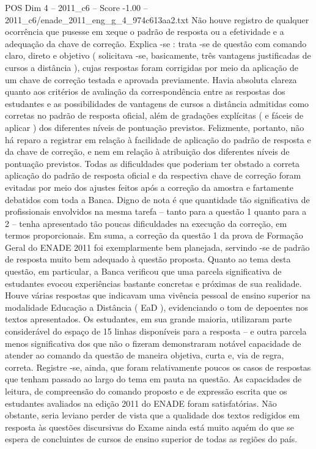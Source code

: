 \begin{textsample}{POS Dim 4 – 2011\_c6 – Score -1.00 – 2011\_c6/enade\_2011\_eng\_g\_4\_974c613aa2.txt}
Não houve registro de qualquer ocorrência que pusesse em xeque o padrão de resposta ou a efetividade e a adequação da chave de correção.
Explica -se : trata -se de questão com comando claro, direto e objetivo ( solicitava -se, basicamente, três vantagens justificadas de cursos a distância ), cujas respostas foram corrigidas por meio da aplicação de um chave de correção testada e aprovada previamente.
Havia absoluta clareza quanto aos critérios de avaliação da correspondência entre as respostas dos estudantes e as possibilidades de vantagens de cursos a distância admitidas como corretas no padrão de resposta oficial, além de gradações explícitas ( e fáceis de aplicar ) dos diferentes níveis de pontuação previstos.
Felizmente, portanto, não há reparo a registrar em relação à facilidade de aplicação do padrão de resposta e da chave de correção, e nem em relação à atribuição dos diferentes níveis de pontuação previstos.
Todas as dificuldades que poderiam ter obstado a correta aplicação do padrão de resposta oficial e da respectiva chave de correção foram evitadas por meio dos ajustes feitos após a correção da amostra e fartamente debatidos com toda a Banca.
Digno de nota é que quantidade tão significativa de profissionais envolvidos na mesma tarefa – tanto para a questão 1 quanto para a 2 – tenha apresentado tão poucas dificuldades na execução da correção, em termos proporcionais.
Em suma, a correção da questão 1 da prova de Formação Geral do ENADE 2011 foi exemplarmente bem planejada, servindo -se de padrão de resposta muito bem adequado à questão proposta.
Quanto ao tema desta questão, em particular, a Banca verificou que uma parcela significativa de estudantes evocou experiências bastante concretas e próximas de sua realidade.
Houve várias respostas que indicavam uma vivência pessoal de ensino superior na modalidade Educação a Distância ( EaD ), evidenciando o tom de depoentes nos textos apresentados.
Os estudantes, em sua grande maioria, utilizaram parte considerável do espaço de 15 linhas disponíveis para a resposta – e outra parcela menos significativa dos que não o fizeram demonstraram notável capacidade de atender ao comando da questão de maneira objetiva, curta e, via de regra, correta.
Registre -se, ainda, que foram relativamente poucos os casos de respostas que tenham passado ao largo do tema em pauta na questão.
As capacidades de leitura, de compreensão do comando proposto e de expressão escrita que os estudantes avaliados na edição 2011 do ENADE foram satisfatórias.
Não obstante, seria leviano perder de vista que a qualidade dos textos redigidos em resposta às questões discursivas do Exame ainda está muito aquém do que se espera de concluintes de cursos de ensino superior de todas as regiões do país.

\end{textsample}
